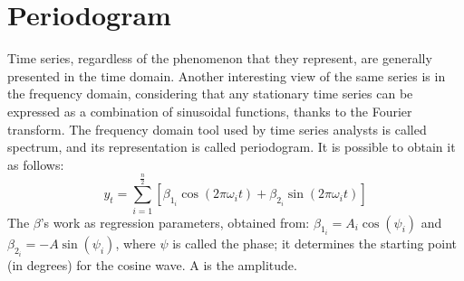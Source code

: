 \documentclass{article}
\begin{document}
\section{Periodogram}
Time series, regardless of the phenomenon that they represent, are generally presented in the time domain. Another interesting view of the same series is in the frequency domain, considering that any stationary time series can be expressed as a combination of sinusoidal functions, thanks to the Fourier transform. The frequency domain tool used by time series analysts is called spectrum, and its representation is called periodogram. It is possible to obtain it as follows:
\begin{equation}
y_t = \sum\limits_{i=1}^{\frac{n}{2}}[\beta_{1_{i}}\cos(2\pi\omega_{i}t) + \beta_{2_{i}}\sin(2\pi\omega_{i}t)]
\end{equation}
The $\beta$'s work as regression parameters, obtained from: $\beta_{1_{i}}=A_{i} \cos(\psi_{i})$ and $\beta_{2_{i}}=-A \sin(\psi_{i})$, where $\psi$ is called the phase; it determines the starting point (in degrees) for the cosine wave. A is the amplitude.
\end{document}
